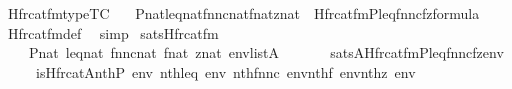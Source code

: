 \begin{isabellebody}
%
\isadelimproof
\isanewline
%
\endisadelimproof
\isanewline
\isanewline
{}\isamarkupfalse%
\ Hfrc{\isacharunderscore}{\kern0pt}at{\isacharunderscore}{\kern0pt}fm{\isacharunderscore}{\kern0pt}type{\isacharbrackleft}{\kern0pt}TC{\isacharbrackright}{\kern0pt}\ {\isacharcolon}{\kern0pt}\isanewline
\ \ {\isachardoublequoteopen}{\isasymlbrakk}P{\isasymin}nat{\isacharsemicolon}{\kern0pt}leq{\isasymin}nat{\isacharsemicolon}{\kern0pt}fnnc{\isasymin}nat{\isacharsemicolon}{\kern0pt}f{\isasymin}nat{\isacharsemicolon}{\kern0pt}z{\isasymin}nat{\isasymrbrakk}\ {\isasymLongrightarrow}\ Hfrc{\isacharunderscore}{\kern0pt}at{\isacharunderscore}{\kern0pt}fm{\isacharparenleft}{\kern0pt}P{\isacharcomma}{\kern0pt}leq{\isacharcomma}{\kern0pt}fnnc{\isacharcomma}{\kern0pt}f{\isacharcomma}{\kern0pt}z{\isacharparenright}{\kern0pt}{\isasymin}formula{\isachardoublequoteclose}\isanewline
%
\isadelimproof
\ \ %
\endisadelimproof
%
\isatagproof
{}\isamarkupfalse%
\ Hfrc{\isacharunderscore}{\kern0pt}at{\isacharunderscore}{\kern0pt}fm{\isacharunderscore}{\kern0pt}def\ \isamarkupfalse%
\ simp%
\endisatagproof
{\isafoldproof}%
%
\isadelimproof
\isanewline
%
\endisadelimproof
\isanewline
{}\isamarkupfalse%
\ sats{\isacharunderscore}{\kern0pt}Hfrc{\isacharunderscore}{\kern0pt}at{\isacharunderscore}{\kern0pt}fm{\isacharcolon}{\kern0pt}\isanewline
\ \ \isanewline
\ \ \ \ {\isachardoublequoteopen}P{\isasymin}nat{\isachardoublequoteclose}\ {\isachardoublequoteopen}leq{\isasymin}nat{\isachardoublequoteclose}\ {\isachardoublequoteopen}fnnc{\isasymin}nat{\isachardoublequoteclose}\ {\isachardoublequoteopen}f{\isasymin}nat{\isachardoublequoteclose}\ {\isachardoublequoteopen}z{\isasymin}nat{\isachardoublequoteclose}\ {\isachardoublequoteopen}env{\isasymin}list{\isacharparenleft}{\kern0pt}A{\isacharparenright}{\kern0pt}{\isachardoublequoteclose}\isanewline
\ \ \isanewline
\ \ \ \ {\isachardoublequoteopen}sats{\isacharparenleft}{\kern0pt}A{\isacharcomma}{\kern0pt}Hfrc{\isacharunderscore}{\kern0pt}at{\isacharunderscore}{\kern0pt}fm{\isacharparenleft}{\kern0pt}P{\isacharcomma}{\kern0pt}leq{\isacharcomma}{\kern0pt}fnnc{\isacharcomma}{\kern0pt}f{\isacharcomma}{\kern0pt}z{\isacharparenright}{\kern0pt}{\isacharcomma}{\kern0pt}env{\isacharparenright}{\kern0pt}\isanewline
\ \ \ \ {\isasymlongleftrightarrow}\ is{\isacharunderscore}{\kern0pt}Hfrc{\isacharunderscore}{\kern0pt}at{\isacharparenleft}{\kern0pt}{\isacharhash}{\kern0pt}{\isacharhash}{\kern0pt}A{\isacharcomma}{\kern0pt}nth{\isacharparenleft}{\kern0pt}P{\isacharcomma}{\kern0pt}\ env{\isacharparenright}{\kern0pt}{\isacharcomma}{\kern0pt}\ nth{\isacharparenleft}{\kern0pt}leq{\isacharcomma}{\kern0pt}\ env{\isacharparenright}{\kern0pt}{\isacharcomma}{\kern0pt}\ nth{\isacharparenleft}{\kern0pt}fnnc{\isacharcomma}{\kern0pt}\ env{\isacharparenright}{\kern0pt}{\isacharcomma}{\kern0pt}nth{\isacharparenleft}{\kern0pt}f{\isacharcomma}{\kern0pt}\ env{\isacharparenright}{\kern0pt}{\isacharcomma}{\kern0pt}nth{\isacharparenleft}{\kern0pt}z{\isacharcomma}{\kern0pt}\ env{\isacharparenright}{\kern0pt}{\isacharparenright}{\kern0pt}{\isachardoublequoteclose}\isanewline

\end{isabellebody}
